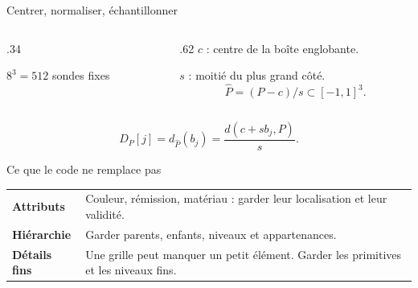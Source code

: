 \begin{frame}{Centrer, normaliser, échantillonner }
\begin{columns}[c,onlytextwidth]
\begin{column}{.34\textwidth}\centering
\resizebox{!}{2.75cm}{}\par
{\small $8^3=512$ sondes fixes}
\end{column}
\begin{column}{.62\textwidth}
$c$ : centre de la boîte englobante.\par\medskip
$s$ : moitié du plus grand côté.
\[
\widehat P=(P-c)/s\subset[-1,1]^3.
\]

\end{column}
\end{columns}
\vspace{.30cm}
\[
\boxed{D_P[j]=d_{\widehat P}(b_j)
=\frac{d(c+s b_j,P)}{s}.}
\]
\end{frame}

\begin{frame}{Ce que le code ne remplace pas}
\vspace{.16cm}
\begin{tabular}{@{}p{}p{}@{}}
\textbf{Attributs} & Couleur, rémission, matériau : garder leur localisation et leur validité.\\[.55cm]
\textbf{Hiérarchie} & Garder parents, enfants, niveaux et appartenances.\\[.55cm]
\textbf{Détails fins} & Une grille peut manquer un petit élément. Garder les primitives et les niveaux fins.
\end{tabular}


\end{frame}
